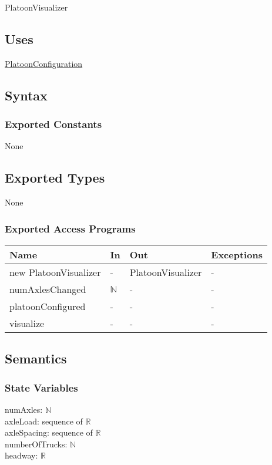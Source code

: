 \documentclass[12pt, titlepage]{article}
\begin{document}
PlatoonVisualizer

\subsection{Uses}
\hyperref[PlatoonConfiguration]{PlatoonConfiguration}

\subsection{Syntax}

\subsubsection{Exported Constants}
None
\subsection{Exported Types}
None

\subsubsection{Exported Access Programs}
\begin{center}
\begin{tabular}{p{5cm} p{2cm} p{4cm} p{5.5cm}}
\hline
\textbf{Name} & \textbf{In} & \textbf{Out} & \textbf{Exceptions} \\
\hline
new PlatoonVisualizer & - & PlatoonVisualizer & - \\
\hline
numAxlesChanged & $\mathbb{N}$ & - & -\\
\hline
platoonConfigured & - & - & -\\
\hline
visualize & - & - & -\\
\hline
\end{tabular}
\end{center}

\subsection{Semantics}

\subsubsection{State Variables}
numAxles: $\mathbb{N}$\\
axleLoad: sequence of $\mathbb{R}$\\
axleSpacing: sequence of $\mathbb{R}$\\
numberOfTrucks: $\mathbb{N}$\\
headway: $\mathbb{R}$
\end{document}

